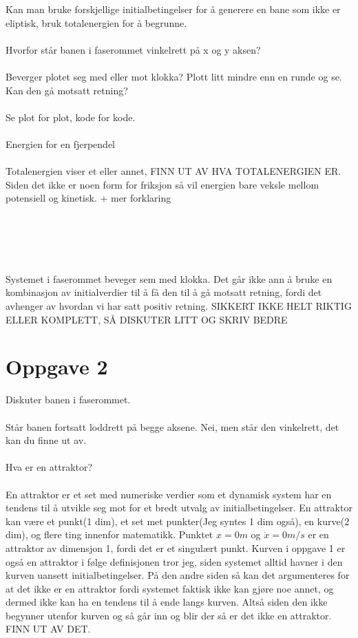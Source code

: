 \documentclass[norsk,a4paper,12pt]{article}
\begin{document}
Kan man bruke forskjellige initialbetingelser for å generere en bane som ikke er eliptisk, bruk totalenergien for å begrunne.
\\
\\
Hvorfor står banen i faserommet vinkelrett på x og y aksen?
\\
\\
Beverger plotet seg med eller mot klokka? Plott litt mindre enn en runde og se. Kan den gå motsatt retning?
\\
\\


Se plot for plot, kode for kode.
\\
\\



Energien for en fjerpendel
\\
\\
Totalenergien viser et eller annet, FINN UT AV HVA TOTALENERGIEN ER. Siden det ikke er noen form for friksjon så vil energien bare veksle mellom potensiell og kinetisk. + mer forklaring
\\
\\
\\
\\
\\
\\
Systemet i faserommet beveger sem med klokka. Det går ikke ann å bruke en kombinasjon av initialverdier til å få den til å gå motsatt retning, fordi det avhenger av hvordan vi har satt positiv retning.  SIKKERT IKKE HELT RIKTIG ELLER KOMPLETT, SÅ DISKUTER LITT OG SKRIV BEDRE




\section*{Oppgave 2}
Diskuter banen i faserommet.
\\
\\
Står banen fortsatt loddrett på begge aksene. Nei, men står den vinkelrett, det kan du finne ut av.
\\
\\
Hva er en attraktor?
\\
\\
En attraktor er et set med numeriske verdier som et dynamisk system har en tendens til å utvikle seg mot for et bredt utvalg av initialbetingelser. En attraktor kan være et punkt(1 dim), et set met punkter(Jeg syntes 1 dim også), en kurve(2 dim), og flere ting innenfor matematikk. Punktet $x=0m$ og $\dot{x}=0m/s$ er en attraktor av dimensjon 1, fordi det er et singulært punkt. Kurven i oppgave 1 er også en attraktor i følge definisjonen tror jeg, siden systemet alltid havner i den kurven uansett initialbetingelser. På den andre siden så kan det argumenteres for at det ikke er en attraktor fordi systemet faktisk ikke kan gjøre noe annet, og dermed ikke kan ha en tendens til å ende langs kurven. Altså siden den ikke begynner utenfor kurven og så går inn og blir der så er det ikke en attraktor. FINN UT AV DET.
\end{document}
